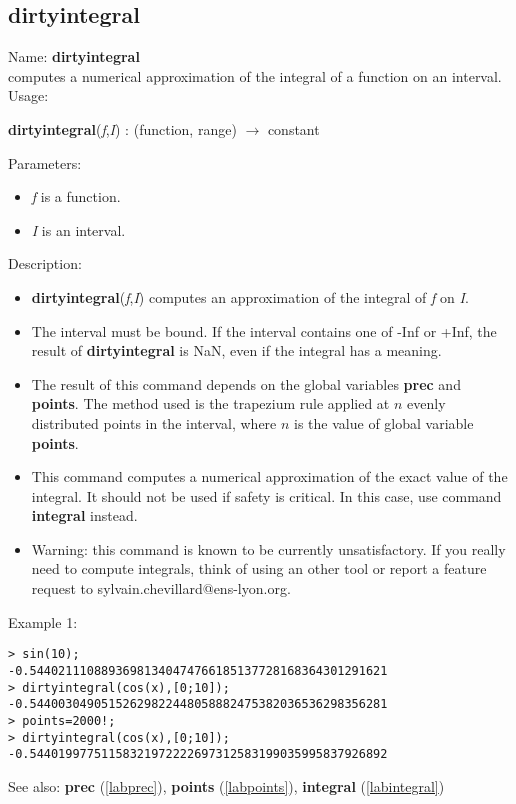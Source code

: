 \subsection{dirtyintegral}
\label{labdirtyintegral}
\noindent Name: \textbf{dirtyintegral}\\
computes a numerical approximation of the integral of a function on an interval.\\
\noindent Usage: 
\begin{center}
\textbf{dirtyintegral}(\emph{f},\emph{I}) : (\textsf{function}, \textsf{range}) $\rightarrow$ \textsf{constant}
\\ 
\end{center}
Parameters: 
\begin{itemize}
\item \emph{f} is a function.
\item \emph{I} is an interval.
\end{itemize}
\noindent Description: \begin{itemize}

\item \textbf{dirtyintegral}(\emph{f},\emph{I}) computes an approximation of the integral of \emph{f} on \emph{I}.

\item The interval must be bound. If the interval contains one of -Inf or +Inf, the 
   result of \textbf{dirtyintegral} is NaN, even if the integral has a meaning.

\item The result of this command depends on the global variables \textbf{prec} and \textbf{points}.
   The method used is the trapezium rule applied at $n$ evenly distributed
   points in the interval, where $n$ is the value of global variable \textbf{points}.

\item This command computes a numerical approximation of the exact value of the 
   integral. It should not be used if safety is critical. In this case, use
   command \textbf{integral} instead.

\item Warning: this command is known to be currently unsatisfactory. If you really
   need to compute integrals, think of using an other tool or report a feature
   request to sylvain.chevillard@ens-lyon.org.
\end{itemize}
\noindent Example 1: 
\begin{center}\begin{minipage}{15cm}\begin{Verbatim}[frame=single]
> sin(10);
-0.54402111088936981340474766185137728168364301291621
> dirtyintegral(cos(x),[0;10]);
-0.54400304905152629822448058882475382036536298356281
> points=2000!;
> dirtyintegral(cos(x),[0;10]);
-0.54401997751158321972222697312583199035995837926892
\end{Verbatim}
\end{minipage}\end{center}
See also: \textbf{prec} (\ref{labprec}), \textbf{points} (\ref{labpoints}), \textbf{integral} (\ref{labintegral})
